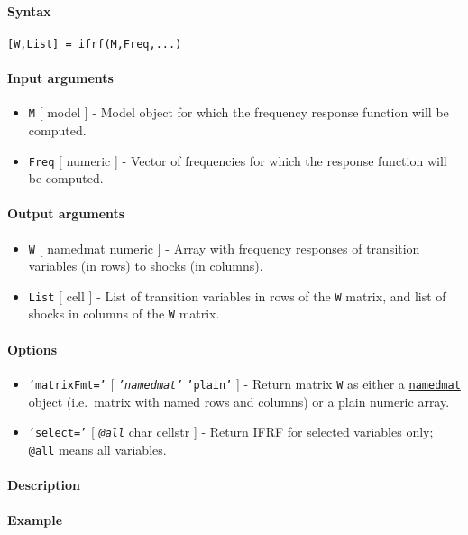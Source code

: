 


	\paragraph{Syntax}

\begin{verbatim}
[W,List] = ifrf(M,Freq,...)
\end{verbatim}

\paragraph{Input arguments}

\begin{itemize}
\item
  \texttt{M} {[} model {]} - Model object for which the frequency
  response function will be computed.
\item
  \texttt{Freq} {[} numeric {]} - Vector of frequencies for which the
  response function will be computed.
\end{itemize}

\paragraph{Output arguments}

\begin{itemize}
\item
  \texttt{W} {[} namedmat \textbar{} numeric {]} - Array with frequency
  responses of transition variables (in rows) to shocks (in columns).
\item
  \texttt{List} {[} cell {]} - List of transition variables in rows of
  the \texttt{W} matrix, and list of shocks in columns of the \texttt{W}
  matrix.
\end{itemize}

\paragraph{Options}

\begin{itemize}
\item
  \texttt{'matrixFmt='} {[} \emph{\texttt{'namedmat'}} \textbar{}
  \texttt{'plain'} {]} - Return matrix \texttt{W} as either a
  \href{namedmat/Contents}{\texttt{namedmat}} object (i.e.~matrix with
  named rows and columns) or a plain numeric array.
\item
  \texttt{'select='} {[} \emph{\texttt{@all}} \textbar{} char \textbar{}
  cellstr {]} - Return IFRF for selected variables only; \texttt{@all}
  means all variables.
\end{itemize}

\paragraph{Description}

\paragraph{Example}



